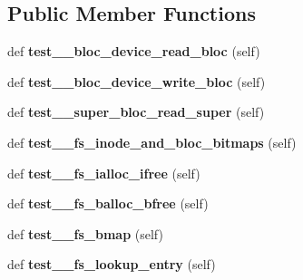 \subsection*{Public Member Functions}
\begin{DoxyCompactItemize}
\item 
\hypertarget{classtester2_1_1_minix_tester_ace7a146509eac31cfc0fc80de9403b08}{}def {\bfseries test\+\_\+\_\+bloc\+\_\+device\+\_\+read\+\_\+bloc} (self)\label{classtester2_1_1_minix_tester_ace7a146509eac31cfc0fc80de9403b08}

\item 
\hypertarget{classtester2_1_1_minix_tester_a24a380e585e1ee9c3305c238c83fb736}{}def {\bfseries test\+\_\+\_\+bloc\+\_\+device\+\_\+write\+\_\+bloc} (self)\label{classtester2_1_1_minix_tester_a24a380e585e1ee9c3305c238c83fb736}

\item 
\hypertarget{classtester2_1_1_minix_tester_ac80a8db66b10e26951f5b3dbb4ba6177}{}def {\bfseries test\+\_\+\_\+super\+\_\+bloc\+\_\+read\+\_\+super} (self)\label{classtester2_1_1_minix_tester_ac80a8db66b10e26951f5b3dbb4ba6177}

\item 
\hypertarget{classtester2_1_1_minix_tester_aea91283fb72bc66c47d112db5b9b0237}{}def {\bfseries test\+\_\+\_\+fs\+\_\+inode\+\_\+and\+\_\+bloc\+\_\+bitmaps} (self)\label{classtester2_1_1_minix_tester_aea91283fb72bc66c47d112db5b9b0237}

\item 
\hypertarget{classtester2_1_1_minix_tester_a486e61bd6413ac33f5d2589b1b5eff47}{}def {\bfseries test\+\_\+\_\+fs\+\_\+ialloc\+\_\+ifree} (self)\label{classtester2_1_1_minix_tester_a486e61bd6413ac33f5d2589b1b5eff47}

\item 
\hypertarget{classtester2_1_1_minix_tester_a138d86bcce3ab9464a9fae0397358b6d}{}def {\bfseries test\+\_\+\_\+fs\+\_\+balloc\+\_\+bfree} (self)\label{classtester2_1_1_minix_tester_a138d86bcce3ab9464a9fae0397358b6d}

\item 
\hypertarget{classtester2_1_1_minix_tester_a9f8509103647b8fec170dc9bd9995d3e}{}def {\bfseries test\+\_\+\_\+fs\+\_\+bmap} (self)\label{classtester2_1_1_minix_tester_a9f8509103647b8fec170dc9bd9995d3e}

\item 
\hypertarget{classtester2_1_1_minix_tester_a439662ecb793a5fa39d2a81b82bc3844}{}def {\bfseries test\+\_\+\_\+fs\+\_\+lookup\+\_\+entry} (self)\label{classtester2_1_1_minix_tester_a439662ecb793a5fa39d2a81b82bc3844}


\end{DoxyCompactItemize}
